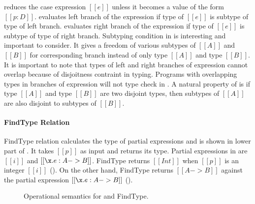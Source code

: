  reduces the case expression $[[e]]$ unless it becomes a value of the form $[[p:D]]$.
 evaluates left branch of the \typeof expression if type of $[[e]]$ is subtype
of type of left branch.
 evaluates right branch of the \typeof expression if type of $[[e]]$ is subtype
of type of right branch.
Subtyping condition in  is interesting and important to consider.
It gives a freedom of various subtypes of $[[A]]$ and $[[B]]$ for corresponding branch instead of only
type $[[A]]$ and type $[[B]]$.
It is important to note that types of left and right branches of \typeof expression cannot overlap
because of disjoitness contraint in typing. Programs with overlapping types in branches of \typeof
expression will not type check in \cal.
A natural property of \cal is if type $[[A]]$ and type $[[B]]$ are two
disjoint types, then subtypes of $[[A]]$ are also disjoint to subtypes of $[[B]]$.

\paragraph{FindType Relation} FindType relation calculates the type of partial expressions
and is shown in lower part of . It takes $[[p]]$ as input and returns its type.
Partial expressions in \cal are $[[i]]$ and $[[\x.e: A -> B]]$.
FindType returns $[[Int]]$ when $[[p]]$ is an integer $[[i]]$ (). On the other hand,
FindType returns $[[A -> B]]$ against the partial expression $[[\x.e : A->B]]$ ().

\begin{figure}[t]
  \begin{small}
    \centering
  \end{small}
  \begin{small}
    \centering
  \end{small}
  \caption{Operational semantics for \cal and FindType.}
  \label{fig:union:os}
\end{figure}


